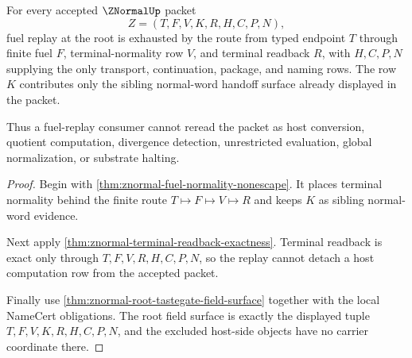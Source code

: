 \begin{theorem}
\label{thm:znormal-fuel-replay-root-exhaustion}
For every accepted $\ZNormalUp$ packet
$$
Z=(T,F,V,K,R,H,C,P,N),
$$
fuel replay at the root is exhausted by the route from typed endpoint $T$ through finite fuel $F$, terminal-normality row $V$, and terminal readback $R$, with $H,C,P,N$ supplying the only transport, continuation, package, and naming rows. The row $K$ contributes only the sibling normal-word handoff surface already displayed in the packet.

Thus a fuel-replay consumer cannot reread the packet as host conversion, quotient computation, divergence detection, unrestricted evaluation, global normalization, or substrate halting.
\end{theorem}
\begin{proof}
Begin with \autoref{thm:znormal-fuel-normality-nonescape}. It places terminal normality behind the finite route $T \longmapsto F \longmapsto V \longmapsto R$ and keeps $K$ as sibling normal-word evidence.

Next apply \autoref{thm:znormal-terminal-readback-exactness}. Terminal readback is exact only through $T,F,V,R,H,C,P,N$, so the replay cannot detach a host computation row from the accepted packet.

Finally use \autoref{thm:znormal-root-tastegate-field-surface} together with the local NameCert obligations. The root field surface is exactly the displayed tuple $T,F,V,K,R,H,C,P,N$, and the excluded host-side objects have no carrier coordinate there.
\end{proof}

